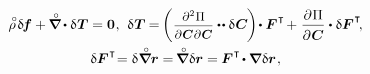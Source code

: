 \nopagebreak\begin{equation}
\label{variationsforcurrentconfiguration}
\begin{array}{c}
\mathcircabove{\rho} \hspace{.25ex} \variation{\hspace{-0.2ex}\bm{f}}
+ \hspace{-0.1ex} \boldnablacircled \hspace{-0.1ex} \dotp \variation{\hspace{.1ex}\firstpiolakirchhoffstress}
= \zerovector
\hspace{.1ex} , \:\,
%
\variation{\hspace{.1ex}\firstpiolakirchhoffstress} \hspace{-0.1ex}
= \hspace{-0.2ex} \left( \hspace{.1ex} \scalebox{.88}{$ \displaystyle\frac{\partial^2 \hspace{.1ex} \potentialenergydensity}{\raisemath{-0.1em}{\partial \hspace{.1ex} \bm{C} \hspace{.1ex} \partial \hspace{.1ex} \bm{C}}} $} \dotdotp \variation{\hspace{.1ex}\bm{C}} \hspace{-0.15ex} \right) \hspace{-0.3ex} \dotp \bm{F}^{\hspace{.1ex}\T} \hspace{-0.25ex}
+ \hspace{.1ex}
\displaystyle\frac{\partial \hspace{.1ex} \potentialenergydensity}{\raisemath{-0.1em}{\partial \hspace{.1ex} \bm{C}}} \dotp \variation{\bm{F}}^{\hspace{.1ex}\T}
\hspace{-0.4ex} ,
\\[1em]
%
\variation{\bm{F}}^{\hspace{.1ex}\T} \hspace{-0.5ex}
= \variation{\hspace{.1ex} \boldnablacircled \currentlocationvector}
= \hspace{-0.2ex} \boldnablacircled \hspace{.1ex} \variation{\currentlocationvector}
= \hspace{-0.1ex} \bm{F}^{\hspace{.1ex}\T} \hspace{-0.25ex} \dotp \boldnabla \hspace{.1ex} \variation{\currentlocationvector} \hspace{.15ex} ,

\end{array}
\end{equation}
